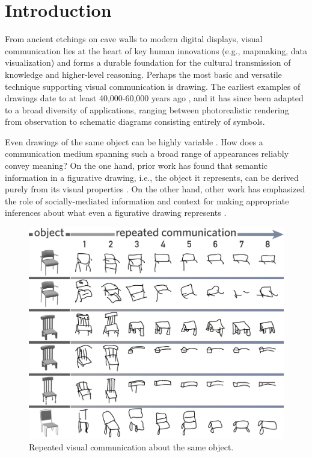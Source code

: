 \documentclass[10pt,letterpaper]{article}
\begin{document}
\section{Introduction}

From ancient etchings on cave walls to modern digital displays, visual communication lies at the heart of key human innovations (e.g., mapmaking, data visualization) and forms a durable foundation for the cultural transmission of knowledge and higher-level reasoning.
Perhaps the most basic and versatile technique supporting visual communication is drawing.
The earliest examples of drawings date to at least 40,000-60,000 years ago \cite{hoffmann2018u,Aubert:2014jy}, and it has since been adapted to a broad diversity of applications, ranging between photorealistic rendering from observation to schematic diagrams consisting entirely of symbols.

Even drawings of the same object can be highly variable .
How does a communication medium spanning such a broad range of appearances reliably convey meaning?
On the one hand, prior work has found that semantic information in a figurative drawing, i.e., the object it represents, can be derived purely from its visual properties \cite{FanCommon2018}.
On the other hand, other work has emphasized the role of socially-mediated information and context for making appropriate inferences about what even a figurative drawing represents \cite{goodman1976languages,gombrich1969art}.

\begin{figure}
\includegraphics[width=0.95\linewidth]{figures/sketch_gallery.pdf}
\caption{Repeated visual communication about the same object.}
\label{sketch_gallery}
\end{figure}
\end{document}
